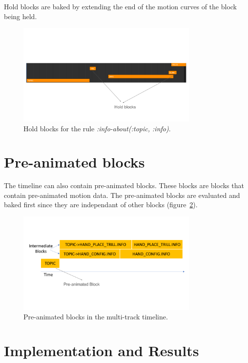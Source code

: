 \documentclass[../../main.tex]{subfiles}
\begin{document}
Hold blocks are baked by extending the end of the motion curves of the block being held.

\begin{figure}
    \centering
    \includegraphics[width=0.8\textwidth]{chapters/multi_track/images/hold_blocks.png}
    \caption{Hold blocks for the rule \emph{:info-about(:topic, :info)}.}
    \label{fig:hold_blocks}
\end{figure}

\section{Pre-animated blocks}
\label{ch:multi_track:preanim_blocks}

The timeline can also contain pre-animated blocks. These blocks are blocks that contain pre-animated motion data. The pre-animated blocks are evaluated and baked first since they are independant of other blocks (figure~\ref{fig:preanim_blocks}).

\begin{figure}[h]
    \centering
    \includegraphics[width=0.8\textwidth]{chapters/multi_track/images/preanim_blocks.png}
    \caption{Pre-animated blocks in the multi-track timeline.}
    \label{fig:preanim_blocks}
\end{figure}

\section{Implementation and Results}
\label{ch:multi_track:implem_results}
\end{document}
